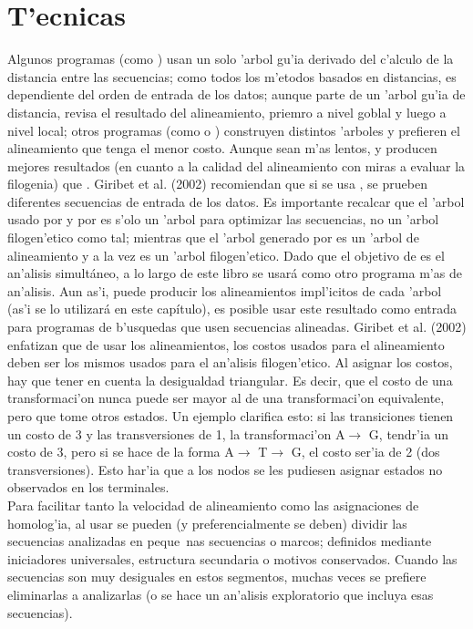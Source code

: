 \section{T'ecnicas}
Algunos programas (como ) usan un solo 'arbol gu'ia derivado del c'alculo de la distancia entre las 
secuencias; como todos los m'etodos basados en distancias, es dependiente del orden de entrada de los datos;  aunque parte de un 'arbol gu'ia de  distancia, revisa el resultado del alineamiento, priemro a nivel goblal y luego a nivel local; otros 
programas (como  o ) construyen distintos 'arboles y prefieren el alineamiento que tenga el menor 
costo. Aunque sean m'as lentos,  y  producen mejores resultados (en cuanto a la calidad del 
alineamiento con miras a evaluar la filogenia) que . Giribet et al. (2002) recomiendan que si se usa 
, se prueben diferentes secuencias de entrada de los datos. Es importante recalcar que el 'arbol usado por 
 y por  es s'olo un 'arbol para optimizar las secuencias, no un 'arbol filogen'etico como tal; 
mientras que el 'arbol generado por  es un 'arbol de alineamiento y a la vez es un 'arbol filogen'etico. Dado que el objetivo de  es el an'alisis simult\'aneo, a lo largo de este libro se usar\'a  como otro programa m'as de an'alisis. Aun as'i,  puede producir los alineamientos impl'icitos de cada 'arbol (as'i se lo utilizar\'a en este cap\'itulo), es posible usar este resultado como entrada para programas de b'usquedas que usen secuencias alineadas. Giribet 
et al. (2002) enfatizan que de usar los alineamientos, los costos usados para el alineamiento deben ser los mismos usados 
para el an'alisis filogen'etico. Al asignar los costos, hay que tener en cuenta la desigualdad triangular. Es decir, que el 
costo de una transformaci'on nunca puede ser mayor al de una transformaci'on equivalente, pero que tome otros estados. 
Un ejemplo clarifica esto: si las transiciones tienen un costo de 3 y las transversiones de 1, la transformaci'on 
A$\rightarrow$ G, tendr'ia un costo de 3, pero si se hace de la forma A$\rightarrow$ T$\rightarrow$ G, el costo ser'ia de 
2 (dos transversiones). Esto har'ia que a los nodos se les pudiesen asignar estados no observados en los terminales.\\
Para facilitar tanto la velocidad de alineamiento como las asignaciones de homolog'ia, al usar  se pueden 
(y preferencialmente se deben) dividir las secuencias analizadas en peque~nas secuencias o marcos; definidos mediante 
iniciadores universales, estructura secundaria o motivos conservados. Cuando las secuencias son muy desiguales en estos 
segmentos, muchas veces se prefiere eliminarlas a analizarlas (o se hace un an'alisis exploratorio que incluya esas 
secuencias).
